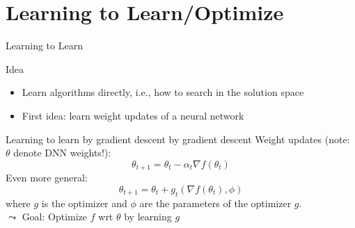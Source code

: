 \section{Learning to Learn/Optimize}
\begin{frame}[c]{Learning to Learn}

\begin{block}{Idea}
	\begin{itemize}
		\item Learn algorithms directly, i.e., how to search in the solution space
		\item First idea: learn weight updates of a neural network
	\end{itemize}
\end{block}

\pause

\begin{block}{Learning to learn by gradient descent by gradient descent\newline {}}
	Weight updates (note: \alert{$\theta$ denote DNN weights!}):
	\begin{equation}
	\theta_{t+1} = \theta_t - \alpha_t \nabla f(\theta_t) \nonumber
	\end{equation}
	\pause
	Even more general:
	\begin{equation}
	\theta_{t+1} = \theta_t + g_t(\nabla f(\theta_t), \phi) \nonumber
	\end{equation}
	where $g$ is the optimizer and $\phi$ are the parameters of the optimizer $g$.\\
	\pause
	$\leadsto$ \alert{Goal: Optimize $f$ wrt $\theta$ by learning $g$}
\end{block}

\end{frame}

